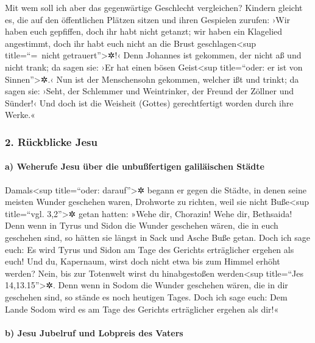  Mit wem soll ich aber das gegenwärtige Geschlecht
vergleichen? Kindern gleicht es, die auf den öffentlichen Plätzen sitzen
und ihren Gespielen zurufen:  ›Wir haben euch gepfiffen,
doch ihr habt nicht getanzt; wir haben ein Klagelied angestimmt, doch
ihr habt euch nicht an die Brust geschlagen\textless sup title=``=~nicht
getrauert''\textgreater✲!‹  Denn Johannes ist gekommen,
der nicht aß und nicht trank; da sagen sie: ›Er hat einen bösen
Geist\textless sup title=``oder: er ist von Sinnen''\textgreater✲.‹
 Nun ist der Menschensohn gekommen, welcher ißt und
trinkt; da sagen sie: ›Seht, der Schlemmer und Weintrinker, der Freund
der Zöllner und Sünder!‹ Und doch ist die Weisheit (Gottes)
gerechtfertigt worden durch ihre Werke.«

\hypertarget{ruxfcckblicke-jesu}{%
\subsubsection{2. Rückblicke Jesu}\label{ruxfcckblicke-jesu}}

\hypertarget{a-weherufe-jesu-uxfcber-die-unbuuxdffertigen-galiluxe4ischen-stuxe4dte}{%
\paragraph{a) Weherufe Jesu über die unbußfertigen galiläischen
Städte}\label{a-weherufe-jesu-uxfcber-die-unbuuxdffertigen-galiluxe4ischen-stuxe4dte}}

 Damals\textless sup title=``oder: darauf''\textgreater✲
begann er gegen die Städte, in denen seine meisten Wunder geschehen
waren, Drohworte zu richten, weil sie nicht Buße\textless sup
title=``vgl. 3,2''\textgreater✲ getan hatten:  »Wehe dir,
Chorazin! Wehe dir, Bethsaida! Denn wenn in Tyrus und Sidon die Wunder
geschehen wären, die in euch geschehen sind, so hätten sie längst in
Sack und Asche Buße getan.  Doch ich sage euch: Es wird
Tyrus und Sidon am Tage des Gerichts erträglicher ergehen als euch!
 Und du, Kapernaum, wirst doch nicht etwa bis zum Himmel
erhöht werden? Nein, bis zur Totenwelt wirst du hinabgestoßen
werden\textless sup title=``Jes 14,13.15''\textgreater✲. Denn wenn in
Sodom die Wunder geschehen wären, die in dir geschehen sind, so stände
es noch heutigen Tages.  Doch ich sage euch: Dem Lande
Sodom wird es am Tage des Gerichts erträglicher ergehen als dir!«

\hypertarget{b-jesu-jubelruf-und-lobpreis-des-vaters}{%
\paragraph{b) Jesu Jubelruf und Lobpreis des
Vaters}\label{b-jesu-jubelruf-und-lobpreis-des-vaters}}

